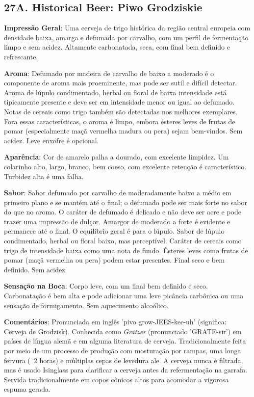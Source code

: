 \subsection*{27A. Historical Beer: Piwo Grodziskie}
\textbf{Impressão Geral}: Uma cerveja de trigo histórica da região central europeia com densidade baixa, amarga e defumada por carvalho, com um perfil de fermentação limpo e sem acidez. Altamente carbonatada, seca, com final bem definido e refrescante.

\textbf{Aroma}: Defumado por madeira de carvalho de baixo a moderado é o componente de aroma mais proeminente, mas pode ser sutil e difícil detectar. Aroma de lúpulo condimentado, herbal ou floral de baixa intensidade está tipicamente presente e deve ser em intensidade menor ou igual ao defumado. Notas de cereais como trigo também são detectadas nos melhores exemplares. Fora essas características, o aroma é limpo, embora ésteres leves de frutas de pomar (especialmente maçã vermelha madura ou pera) sejam bem-vindos. Sem acidez. Leve enxofre é opcional.

\textbf{Aparência}: Cor de amarelo palha a dourado, com excelente limpidez. Um colarinho alto, largo, branco, bem coeso, com excelente retenção é característico. Turbidez alta é uma falha.

\textbf{Sabor}: Sabor defumado por carvalho de moderadamente baixo a médio em primeiro plano e se mantém até o final; o defumado pode ser mais forte no sabor do que no aroma. O caráter de defumado é delicado e não deve ser acre e pode trazer uma impressão de dulçor. Amargor de moderado a forte é evidente e permanece até o final. O equilíbrio geral é para o lúpulo. Sabor de lúpulo condimentado, herbal ou floral baixo, mas perceptível. Caráter de cereais como trigo de intensidade baixa como uma nota de fundo. Ésteres leves como frutas de pomar (maçã vermelha ou pera) podem estar presentes. Final seco e bem definido. Sem acidez.

\textbf{Sensação na Boca}: Corpo leve, com um final bem definido e seco. Carbonatação é bem alta e pode adicionar uma leve picância carbônica ou uma sensação de formigamento. Sem aquecimento alcoólico.

\textbf{Comentários}: Pronunciada em inglês 'pivo grow-JEES-kee-uh' (significa: Cerveja de Grodzisk). Conhecida como \textit{Grätzer} (pronunciado 'GRATE-sir') em países de língua alemã e em alguma literatura de cerveja. Tradicionalmente feita por meio de um processo de produção com mosturação por rampas, uma longa fervura (~2 horas) e múltiplas cepas de levedura ale. A cerveja nunca é filtrada, mas é usado Isinglass para clarificar a cerveja antes da refermentação na garrafa. Servida tradicionalmente em copos cônicos altos para acomodar a vigorosa espuma gerada.

